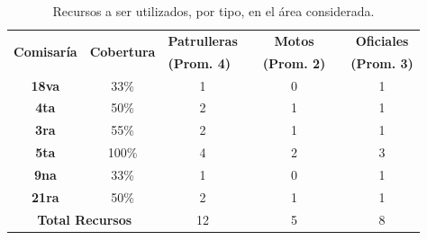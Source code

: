 \begin{table}[]
\centering
\caption{Recursos a ser utilizados, por tipo, en el área considerada.}
\label{table:calculo-recursos}
\begin{tabular}{@{}ccccccc@{}}
\toprule
\multirow{2}{*}{\textbf{Comisaría}} & \multirow{2}{*}{\textbf{Cobertura}} & \textbf{Patrulleras}                    & \multicolumn{1}{l}{} & \textbf{Motos}                          & \multicolumn{1}{l}{} & \textbf{Oficiales}                      \\ \cmidrule(lr){3-3} \cmidrule(lr){5-5} \cmidrule(l){7-7} 
                                    &                                     & \multicolumn{1}{l}{\textbf{(Prom. 4)}} & \multicolumn{1}{l}{} & \multicolumn{1}{l}{\textbf{(Prom. 2)}} & \multicolumn{1}{l}{} & \multicolumn{1}{l}{\textbf{(Prom. 3)}} \\ \midrule
\textbf{18va}                       & 33\%                                & 1                                       &                      & 0                                       &                      & 1                                       \\
\textbf{4ta}                        & 50\%                                & 2                                       &                      & 1                                       &                      & 1                                       \\
\textbf{3ra}                        & 55\%                                & 2                                       &                      & 1                                       &                      & 1                                       \\
\textbf{5ta}                        & 100\%                               & 4                                       &                      & 2                                       &                      & 3                                       \\
\textbf{9na}                        & 33\%                                & 1                                       &                      & 0                                       &                      & 1                                       \\
\textbf{21ra}                       & 50\%                                & 2                                       &                      & 1                                       &                      & 1                                       \\ \midrule
\multicolumn{2}{c}{\textbf{Total Recursos}}                               & 12                                      &                      & 5                                       &                      & 8                                       \\
\bottomrule
\end{tabular}
\end{table}
